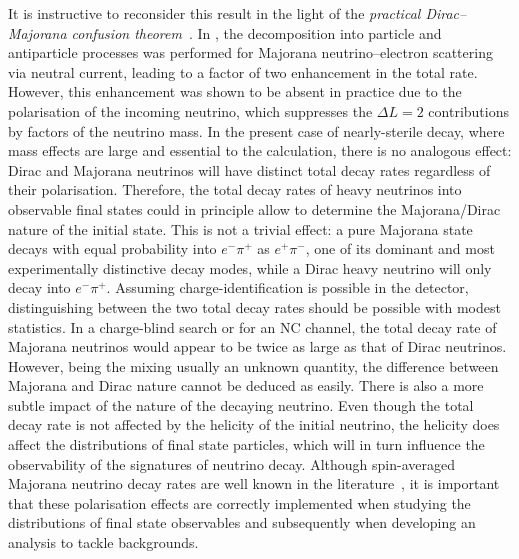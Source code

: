 It is instructive to reconsider this result in the light of the %
\emph{practical Dirac--Majorana confusion theorem}~\cite{Kayser:1981nw, Kayser:1982br}.
In , the decomposition into particle and antiparticle processes was performed for %
Majorana neutrino--electron scattering via neutral current, leading to a factor of two enhancement in the total rate.
However, this enhancement was shown to be absent in practice due to the polarisation of the incoming neutrino, %
which suppresses the $\Delta L = 2$ contributions by factors of the neutrino mass. 
In the present case of nearly-sterile decay, where mass effects are large and essential to the calculation, %
there is no analogous effect: Dirac and Majorana neutrinos will have distinct total decay rates regardless of their polarisation. 
Therefore, the total decay rates of heavy neutrinos into observable final states could in principle allow to determine %
the Majorana/Dirac nature of the initial state.
This is not a trivial effect: a pure Majorana state decays with equal probability into $e^-\pi^+$ as $e^+ \pi^-$, %
one of its dominant and most experimentally distinctive decay modes, while a Dirac heavy neutrino %
will only decay into $e^-\pi^+$.
%
Assuming charge-identification is possible in the detector, distinguishing between the two total decay rates %
should be possible with modest statistics. %
In a charge-blind search or for an NC channel, the total decay rate of Majorana neutrinos would appear %
to be twice as large as that of Dirac neutrinos.
However, being the mixing usually an unknown quantity, the difference between Majorana and Dirac nature cannot be deduced as easily.
There is also a more subtle impact of the nature of the decaying neutrino.
Even though the total decay rate is not affected by the helicity of the initial neutrino, %
the helicity does affect the distributions of final state particles, which will in turn influence the observability of %
the signatures of neutrino decay. 
Although spin-averaged Majorana neutrino decay rates are well known in the %
literature~\cite{Atre:2009rg,Gorbunov:2007ak,Helo:2010cw,Bondarenko:2018ptm}, %
it is important that these polarisation effects are correctly implemented when studying the distributions of %
final state observables and subsequently when developing an analysis to tackle backgrounds. 

